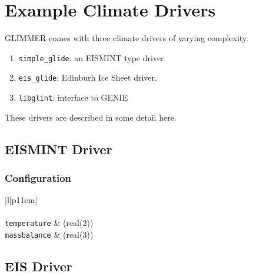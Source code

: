 \section{Example Climate Drivers}
GLIMMER comes with three climate drivers of varying complexity:
\begin{enumerate}
 \item \texttt{simple\_glide}: an EISMINT type driver
 \item \texttt{eis\_glide}: Edinburh Ice Sheet driver.
 \item \texttt{libglint}: interface to GENIE
\end{enumerate}
These drivers are described in some detail here.

\subsection{EISMINT Driver}
\subsubsection{Configuration}
\begin{center}
  \tablefirsthead{%
    \hline
  }
  \tablelasttail{\hline}
  \begin{supertabular}{|l|p{11cm}|}
    \hline
    \\
    \hline
    \\
    \hline
    \texttt{temperature} & (real(2)) \\
    \texttt{massbalance} & (real(3)) \\
    \hline
  \end{supertabular}
\end{center}

\newpage
\subsection{EIS Driver}
